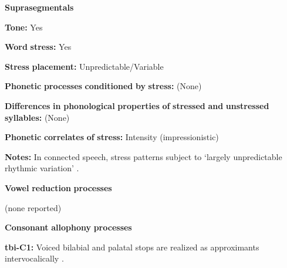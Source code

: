 \documentclass[output=paper]{langsci/langscibook}
\begin{document}
\begin{styleBody}
\textbf{Suprasegmentals}
\end{styleBody}

\begin{styleBody}
\textbf{Tone:} Yes
\end{styleBody}

\begin{styleBody}
\textbf{Word} \textbf{stress:} Yes
\end{styleBody}

\begin{styleBody}
\textbf{Stress} \textbf{placement:} Unpredictable/Variable
\end{styleBody}

\begin{styleBody}
\textbf{Phonetic} \textbf{processes} \textbf{conditioned} \textbf{by} \textbf{stress:} (None)
\end{styleBody}

\begin{styleBody}
\textbf{Differences} \textbf{in} \textbf{phonological} \textbf{properties} \textbf{of} \textbf{stressed} \textbf{and} \textbf{unstressed} \textbf{syllables:} (None)
\end{styleBody}

\begin{styleBody}
\textbf{Phonetic} \textbf{correlates} \textbf{of} \textbf{stress:} Intensity (impressionistic)
\end{styleBody}

\begin{styleBody}
\textbf{Notes:} In connected speech, stress patterns subject to ‘largely unpredictable rhythmic variation’ \citep[12-13]{Crewe1975}.
\end{styleBody}

\begin{styleBody}
\textbf{Vowel} \textbf{reduction} \textbf{processes}
\end{styleBody}

\begin{styleBody}
(none reported)
\end{styleBody}

\begin{styleBody}
\textbf{Consonant} \textbf{allophony} \textbf{processes}
\end{styleBody}

\begin{styleBody}
\textbf{tbi-C1:} Voiced bilabial and palatal stops are realized as approximants intervocalically \citep[25]{Stirtz2011}.
\end{styleBody}
\end{document}
